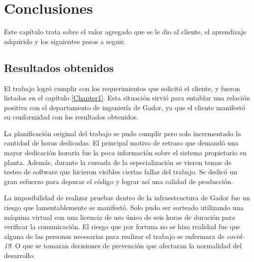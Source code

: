 
\chapter{Conclusiones} %

\label{Chapter5} %




Este capítulo trata sobre el valor agregado que se le dio al cliente, el aprendizaje adquirido y los siguientes pasos a seguir.

\section{Resultados obtenidos}

El trabajo logró cumplir con los requerimientos que solicitó el cliente, y fueron listados en el capítulo \ref{Chapter1}.
Esta situación sirvió para entablar una relación positiva con el departamento de ingeniería de Gador, ya que el cliente manifestó su conformidad con los resultados obtenidos.

La planificación original del trabajo se pudo cumplir pero solo incrementado la cantidad de horas dedicadas.
El principal motivo de retraso que demandó una mayor dedicación horaria fue la poca información sobre el sistema propietario en planta.
Además, durante la cursada de la especialización se vieron temas de testeo de software que hicieron visibles ciertas fallas del trabajo.
Se dedicó un gran esfuerzo para depurar el código y lograr así una calidad de producción.

La imposibilidad de realizar pruebas dentro de la infraestructura de Gador fue un riesgo que lamentablemente se manifestó.
Solo pudo ser sorteado utilizando una máquina virtual con una licencia de uso único de seis horas de duración para verificar la comunicación.
El riesgo que por fortuna no se hizo realidad fue que alguna de las personas necesarias para realizar el trabajo se enfermara de \emph{covid-19}. O que se tomaran decisiones de prevención que afectaran la normalidad del desarrollo.

